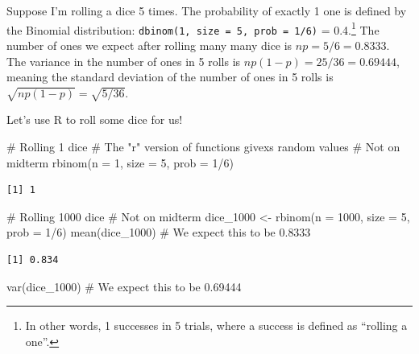 \documentclass[
  letterpaper,
  DIV=11,
  numbers=noendperiod,
  oneside]{scrreprt}
\newenvironment{Shaded}{\begin{snugshade}}{\end{snugshade}}
\newcommand{\AttributeTok}[1]{\textcolor[rgb]{0.40,0.45,0.13}{#1}}
\newcommand{\CommentTok}[1]{\textcolor[rgb]{0.37,0.37,0.37}{#1}}
\newcommand{\DecValTok}[1]{\textcolor[rgb]{0.68,0.00,0.00}{#1}}
\newcommand{\FunctionTok}[1]{\textcolor[rgb]{0.28,0.35,0.67}{#1}}
\newcommand{\NormalTok}[1]{\textcolor[rgb]{0.00,0.23,0.31}{#1}}
\newcommand{\OtherTok}[1]{\textcolor[rgb]{0.00,0.23,0.31}{#1}}
\newcommand{\SpecialCharTok}[1]{\textcolor[rgb]{0.37,0.37,0.37}{#1}}
\begin{document}
Suppose I'm rolling a dice 5 times. The probability of exactly 1 one is
defined by the Binomial distribution:
\texttt{dbinom(1,\ size\ =\ 5,\ prob\ =\ 1/6)} = 0.4.\footnote{In other
  words, 1 successes in 5 trials, where a success is defined as
  ``rolling a one''.} The number of ones we expect after rolling many
many dice is \(np = 5/6 =0.8333\). The variance in the number of ones in
5 rolls is \(np(1 - p) = 25/36 = 0.69444\), meaning the standard
deviation of the number of ones in 5 rolls is
\(\sqrt{np(1-p)} = \sqrt{5/36}\).

Let's use R to roll some dice for us!

\begin{Shaded}
\begin{Highlighting}[]
\CommentTok{\# Rolling 1 dice}
\CommentTok{\# The "r" version of functions givexs random values}
\CommentTok{\# Not on midterm}
\FunctionTok{rbinom}\NormalTok{(}\AttributeTok{n =} \DecValTok{1}\NormalTok{, }\AttributeTok{size =} \DecValTok{5}\NormalTok{, }\AttributeTok{prob =} \DecValTok{1}\SpecialCharTok{/}\DecValTok{6}\NormalTok{)}
\end{Highlighting}
\end{Shaded}

\begin{verbatim}
[1] 1
\end{verbatim}

\begin{Shaded}
\begin{Highlighting}[]
\CommentTok{\# Rolling 1000 dice}
\CommentTok{\# Not on midterm}
\NormalTok{dice\_1000 }\OtherTok{\textless{}{-}} \FunctionTok{rbinom}\NormalTok{(}\AttributeTok{n =} \DecValTok{1000}\NormalTok{, }\AttributeTok{size =} \DecValTok{5}\NormalTok{, }\AttributeTok{prob =} \DecValTok{1}\SpecialCharTok{/}\DecValTok{6}\NormalTok{)}
\FunctionTok{mean}\NormalTok{(dice\_1000) }\CommentTok{\# We expect this to be 0.8333}
\end{Highlighting}
\end{Shaded}

\begin{verbatim}
[1] 0.834
\end{verbatim}

\begin{Shaded}
\begin{Highlighting}[]
\FunctionTok{var}\NormalTok{(dice\_1000) }\CommentTok{\# We expect this to be 0.69444}
\end{Highlighting}
\end{Shaded}
\end{document}
